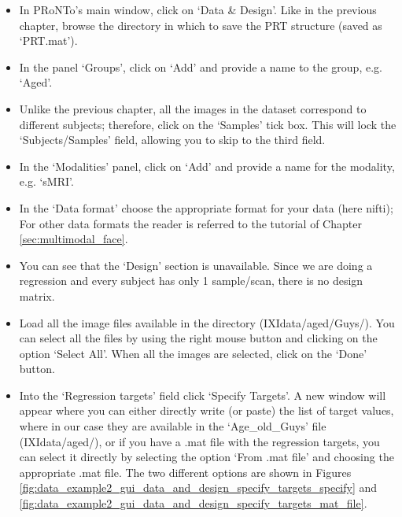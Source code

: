 \begin{itemize}

	\item In PRoNTo's main window, click on `Data \& Design'. Like in the previous chapter, browse the directory in which to save the PRT structure (saved as `PRT.mat').
	
	\item In the panel `Groups', click on `Add' and provide a name to the group, e.g. `Aged'.

	\item Unlike the previous chapter, all the images in the dataset correspond to different subjects; therefore, click on the `Samples' tick box. This will lock the `Subjects/Samples' field, allowing you to skip to the third field.
	
	\item In the `Modalities' panel, click on `Add' and provide a name for the modality, e.g. `sMRI'.
	
	\item In the `Data format' choose the appropriate format for your data (here nifti); For other data formats the reader is referred to the tutorial of Chapter \ref{sec:multimodal_face}.
	
	\item You can see that the `Design' section is unavailable. Since we are doing a regression and every subject has only 1 sample/scan, there is no design matrix.
	
	\item Load all the image files available in the directory (IXIdata/aged/Guys/). You can select all the files by using the right mouse button and clicking on the option `Select All'. When all the images are selected, click on the `Done' button.
 
    \item Into the `Regression targets' field click `Specify Targets'. A new window will appear where you can either directly write (or paste) the list of target values, where in our case they are available in the `Age\_old\_Guys' file (IXIdata/aged/), or if you have a .mat file with the regression targets, you can select it directly by selecting the option `From .mat file' and choosing the appropriate .mat file. The two different options are shown in Figures \ref{fig:data_example2_gui_data_and_design_specify_targets_specify} and \ref{fig:data_example2_gui_data_and_design_specify_targets_mat_file}.


\end{itemize}
